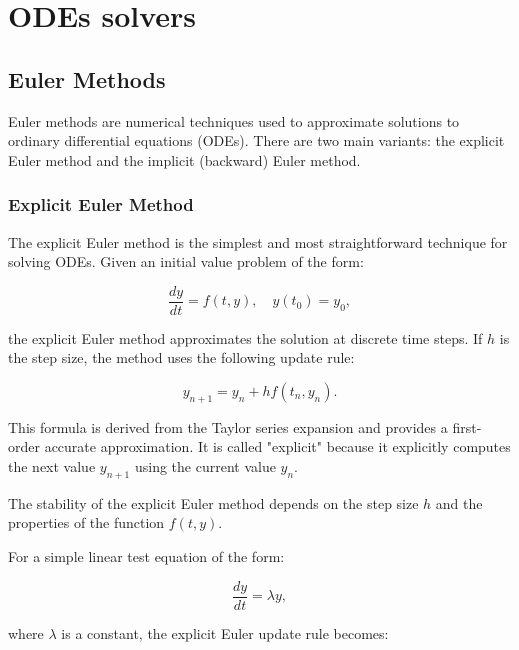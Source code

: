 \documentclass[a4paper,12pt,french]{article}
\begin{document}



\section{ODEs solvers}
\subsection{Euler Methods}
Euler methods \cite{lakoba2012simple} are numerical techniques used to approximate solutions to ordinary differential equations (ODEs). There are two main variants: the explicit Euler method and the implicit (backward) Euler method.
\subsubsection{Explicit Euler Method}
The explicit Euler method is the simplest and most straightforward technique for solving ODEs. Given an initial value problem of the form:

\[
\frac{dy}{dt} = f(t, y), \quad y(t_0) = y_0,
\]

the explicit Euler method approximates the solution at discrete time steps. If \(h\) is the step size, the method uses the following update rule:

\[
y_{n+1} = y_n + h f(t_n, y_n).
\]

This formula is derived from the Taylor series expansion and provides a first-order accurate approximation. It is called "explicit" because it explicitly computes the next value \(y_{n+1}\) using the current value \(y_n\).

The stability of the explicit Euler method depends on the step size \(h\) and the properties of the function \(f(t, y)\).

For a simple linear test equation of the form:

\[
\frac{dy}{dt} = \lambda y,
\]

where \(\lambda\) is a constant, the explicit Euler update rule becomes:
\end{document}
